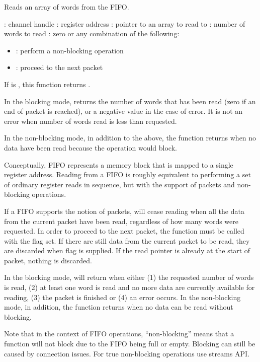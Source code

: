 \documentclass[a4paper,12pt,twoside,extrafontsizes]{memoir}
\begin{document}
\begin{funcdescr}
	Reads an array of words from the FIFO.
\end{funcdescr}

\begin{funcparams}
	: channel handle
	: register address
	: pointer to an array to read to
	: number of words to read
	: zero or any combination of the following:
		\begin{itemize}
			\item{}: perform a non-blocking operation
			\item{}: proceed to the next packet
		\end{itemize}
\end{funcparams}

\begin{funcret}
	If  is , this function returns .
	
	In the blocking mode, returns the number of words that has been read (zero if an end of packet is reached), or a negative value in the case of error. It is not an error when number of words read is less than requested.
	
	In the non-blocking mode, in addition to the above, the function returns  when no data have been read because the operation would block.
\end{funcret}

\begin{funcremarks}
	Conceptually, FIFO represents a memory block that is mapped to a single register address. Reading from a FIFO is roughly equivalent to performing a set of ordinary register reads in sequence, but with the support of packets and non-blocking operations.

	If a FIFO supports the notion of packets,  will cease reading when all the data from the current packet have been read, regardless of how many words were requested. In order to proceed to the next packet, the function must be called with the  flag set. If there are still data from the current packet to be read, they are discarded when  flag is supplied. If the read pointer is already at the start of packet, nothing is discarded.

	In the blocking mode,  will return when either (1) the requested number of words is read, (2) at least one word is read and no more data are currently available for reading, (3) the packet is finished or (4) an error occurs. In the non-blocking mode, in addition, the function returns when no data can be read without blocking.

	Note that in the context of FIFO operations, ``non-blocking'' means that a function will not block due to the FIFO being full or empty. Blocking can still be caused by connection issues. For true non-blocking operations use streams API.
\end{funcremarks}
\end{document}
